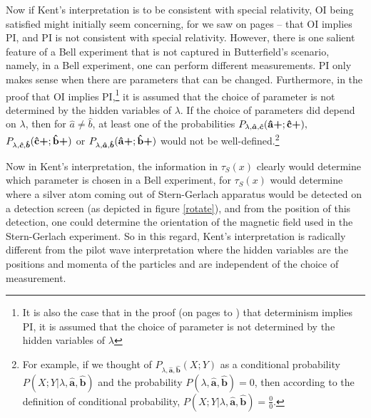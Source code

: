 Now if Kent's interpretation is to be consistent with special relativity, OI being satisfied might initially seem concerning, for we saw on pages \pageref{OI}--\pageref{OIPIproofend} that OI implies PI, and PI is not consistent with special relativity. However, there is one salient feature of a Bell experiment that is not captured in Butterfield's scenario, namely, in a Bell experiment, one can perform different measurements.  PI only makes sense when there are parameters that can be changed. Furthermore, in the proof that OI implies PI,\footnote{It is also the case that in the proof (on pages \pageref{bellinequality2} to \pageref{PIdeterminism}) that determinism implies PI, it is assumed that the choice of parameter is not determined by the hidden variables of $\lambda$} it is assumed that the choice of parameter is not determined by the hidden variables of $\lambda$. If the choice of parameters did depend on $\lambda$, then for $\hat{a}\neq\hat{b}$, at least one of the probabilities $P_{\lambda,\bm{\hat{a}},\bm{\hat{c}}}(\vb{\hat{{a}}}\bm{+};\vb{\hat{{c}}}\bm{+}),$ $P_{\lambda,\bm{\hat{c}},\bm{\hat{b}}}(\vb{\hat{{c}}}\bm{+};\vb{\hat{{b}}}\bm{+})$ or $P_{\lambda,\bm{\hat{a}},\bm{\hat{b}}}(\vb{\hat{{a}}}\bm{+};\vb{\hat{{b}}}\bm{+})$ would not be well-defined.\footnote{For example, if we thought of $P_{\lambda,\bm{\hat{a}},\bm{\hat{b}}}(X;Y)$ as a conditional probability $P(X;Y|\lambda,\bm{\hat{a}},\bm{\hat{b}})$ and the probability $P(\lambda,\bm{\hat{a}},\bm{\hat{b}})=0$, then according to the definition of conditional probability,  $P(X;Y|\lambda,\bm{\hat{a}},\bm{\hat{b}})=\frac{0}{0}.$} 

Now in Kent's interpretation, the information in $\tau_S(x)$ clearly would determine which parameter is chosen in a Bell experiment, for $\tau_S(x)$ would determine where a silver atom coming out of Stern-Gerlach apparatus would be detected on a detection screen (as depicted in figure \ref{rotate}), and from the position of this detection, one could determine the orientation of the magnetic field used in the Stern-Gerlach experiment. So in this regard, Kent's interpretation is radically different from the pilot wave interpretation where the hidden variables are the positions and momenta of the particles and are independent of the choice of measurement.

